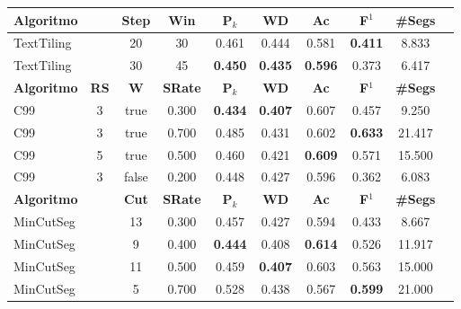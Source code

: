 
\begin{table}[!h]
\small
	\centering
	\begin{tabular}{|l||c|c|c|c|c|c|c|c|c|} \hline

		\textbf{Algoritmo} && 
		\textbf{Step} &
		\textbf{Win} & 
		\textbf{P$_k$} & 
		\textbf{WD} & 
		\textbf{Ac} & 
		\textbf{F$^1$} &
		\textbf{\#Segs} \\	\hline

TextTiling && 20 & 30 & 0.461 & 0.444 & 0.581 
		   & \cellcolor{gray!20} \textbf{0.411} & 8.833  \\ \hline 
TextTiling && 30 & 45 & \cellcolor{gray!20} \textbf{0.450} & \cellcolor{gray!20} \textbf{0.435} & \cellcolor{gray!20} \textbf{0.596} 
		   & 0.373 & 6.417  \\ \hline 

\hline
		\textbf{Algoritmo} &
		\textbf{RS} &
		\textbf{W} & 
		\textbf{SRate}& 
		\textbf{P$_k$} & 
		\textbf{WD} & 
		\textbf{Ac} & 
		\textbf{F$^1$} &
		\textbf{\#Segs} \\	\hline

C99 & 3 & true  &0.300 &  \cellcolor{gray!20} \textbf{0.434} & \cellcolor{gray!20} \textbf{0.407} & 0.607 
	& 0.457 & 9.250  \\ \hline 
C99 & 3 & true  &0.700 &  0.485 & 0.431 & 0.602 
	& \cellcolor{gray!20} \textbf{0.633} & 21.417  \\ \hline 
C99 & 5 & true  &0.500 &  0.460 & 0.421 & \cellcolor{gray!20} \textbf{0.609} 
	& 0.571 & 15.500  \\ \hline 
C99 & 3 & false &0.200 &  0.448 & 0.427 & 0.596 
	& 0.362 & 6.083  \\ \hline 


\hline
		\textbf{Algoritmo} && 
		\textbf{Cut} & 
		\textbf{SRate} &
		\textbf{P$_k$} & 
		\textbf{WD} & 
		\textbf{Ac} & 
		\textbf{F$^1$} &
		\textbf{\#Segs} \\	\hline


MinCutSeg && 13 & 0.300 & 0.457 & 0.427 & 0.594 
		  & 0.433 & 8.667  \\ \hline 
MinCutSeg && 9  & 0.400 & \cellcolor{gray!20} \textbf{0.444} & 0.408 & \cellcolor{gray!20} \textbf{0.614} 
		  & 0.526 & 11.917  \\ \hline 
MinCutSeg && 11 & 0.500 & 0.459 & \cellcolor{gray!20} \textbf{0.407} & 0.603 
		  & 0.563 & 15.000  \\ \hline 
MinCutSeg && 5  & 0.700 & 0.528 & 0.438 & 0.567 
		  & \cellcolor{gray!20} \textbf{0.599} & 21.000  \\ \hline 



\end{tabular}
\end{table}
